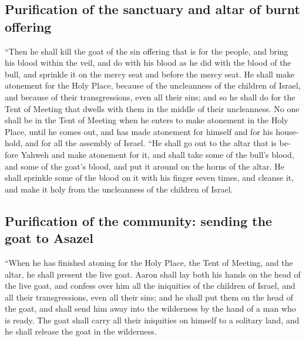 \begin{paracol}{2}
\begin{otherlanguage}{english}
\hypertarget{purification-of-the-sanctuary-and-altar-of-burnt-offering}{%
\subsection{Purification of the sanctuary and altar of burnt
offering}\label{purification-of-the-sanctuary-and-altar-of-burnt-offering}}

 ``Then he shall kill the goat of the sin offering that
is for the people, and bring his blood within the veil, and do with his
blood as he did with the blood of the bull, and sprinkle it on the mercy
seat and before the mercy seat.  He shall make atonement
for the Holy Place, because of the uncleanness of the children of
Israel, and because of their transgressions, even all their sins; and so
he shall do for the Tent of Meeting that dwells with them in the middle
of their uncleanness.  No one shall be in the Tent of
Meeting when he enters to make atonement in the Holy Place, until he
comes out, and has made atonement for himself and for his household, and
for all the assembly of Israel.  ``He shall go out to the
altar that is before Yahweh and make atonement for it, and shall take
some of the bull's blood, and some of the goat's blood, and put it
around on the horns of the altar.  He shall sprinkle some
of the blood on it with his finger seven times, and cleanse it, and make
it holy from the uncleanness of the children of Israel.

\hypertarget{purification-of-the-community-sending-the-goat-to-asazel}{%
\subsection{Purification of the community: sending the goat to
Asazel}\label{purification-of-the-community-sending-the-goat-to-asazel}}

 ``When he has finished atoning for the Holy Place, the
Tent of Meeting, and the altar, he shall present the live goat.
 Aaron shall lay both his hands on the head of the live
goat, and confess over him all the iniquities of the children of Israel,
and all their transgressions, even all their sins; and he shall put them
on the head of the goat, and shall send him away into the wilderness by
the hand of a man who is ready.  The goat shall carry all
their iniquities on himself to a solitary land, and he shall release the
goat in the wilderness.


\end{otherlanguage}
\end{paracol}
